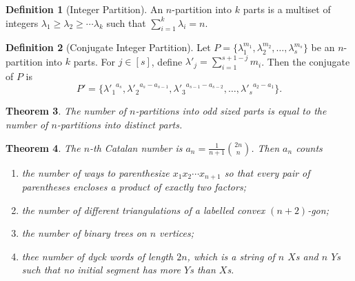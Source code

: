 \documentclass[12]{article}
\newtheorem{thm}{Theorem}[section] %
\theoremstyle{definition}
\newtheorem{defn}[thm]{Definition} %
\begin{document}
	\begin{defn}[Integer Partition]
		An $n$-partition into $k$ parts is a multiset of integers $\lambda_1 \geq \lambda_2 \geq \cdots \lambda_k$ such that $\sum_{i = 1}^k \lambda_i = n$.
	\end{defn}

	\begin{defn}[Conjugate Integer Partition]
		Let $P = \{\lambda_1^{m_1}, \lambda_2^{m_2}, \ldots, \lambda_s^{m_s}\}$ be an $n$-partition into $k$ parts.  For $j \in [s]$, define $\lambda'_j = \sum_{i = 1}^{s+1-j} m_i$.  Then the conjugate of $P$ is
		$$P' = \{{\lambda'_{1}}^{a_s}, {\lambda'_{2}}^{a_s-a_{s-1}}, {\lambda'_{3}}^{a_{s-1}-a_{s-2}}, \ldots, {\lambda'_{s}}^{a_2 - a_1}\}.$$
	\end{defn}
	
	\begin{thm}
		The number of $n$-partitions into odd sized parts is equal to the number of $n$-partitions into distinct parts.
	\end{thm}

	\begin{thm}
		The $n$-th Catalan number is $a_n = \frac{1}{n+1}{2n \choose n}$.  Then $a_n$ counts
		\begin{enumerate}
			\item the number of ways to parenthesize $x_1x_2\cdots x_{n+1}$ so that every pair of parentheses encloses a product of exactly two factors;
			\item the number of different triangulations of a labelled convex $(n+2)$-gon;
			
			\item the number of binary trees on $n$ vertices;
			
			\item thee number of dyck words of length $2n$, which is a string of $n$ $X$s and $n$ $Y$s such that no initial segment has more $Y$s than $X$s.
		\end{enumerate}
	\end{thm}
	
	
\end{document}
